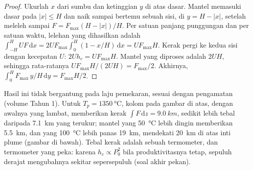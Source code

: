 \begin{proof}
Ukurlah $x$ dari sumbu dan ketinggian $y$ di atas dasar. Mantel memasuki dasar
pada $|x| \le H$ dan naik sampai bertemu sebuah sisi, di $y = H - |x|$, setelah meleleh sampai
$F = F_{\max}(H - |x|)/H$. Per satuan panjang punggungan dan per satuan waktu, lelehan yang dihasilkan adalah
$\int_{-H}^{H} U F\,\mathrm dx = 2UF_{\max}\int_0^H (1 - x/H)\,\mathrm dx =
UF_{\max}H$. Kerak pergi ke kedua sisi dengan kecepatan $U$: $2Uh_c = UF_{\max}H$.
Mantel yang diproses adalah $2UH$, sehingga  rata-ratanya $UF_{\max}H/(2UH) =
F_{\max}/2$. Akhirnya, $\int_0^H F_{\max}\,y/H\,\mathrm dy = F_{\max}H/2$.
\end{proof}

Hasil ini tidak bergantung pada laju pemekaran, sesuai dengan pengamatan (volume
Tahun 1). Untuk $T_p = \qty{1350}{\celsius}$, kolom pada gambar di atas, dengan
awalnya yang lambat, memberikan kerak $\int F\,\mathrm dz = \qty{9.0}{km}$, sedikit lebih
tebal daripada \qty{7.1}{km} yang terukur; mantel yang \qty{50}{\celsius} lebih dingin memberikan
\qty{5.5}{km}, dan yang \qty{100}{\celsius} lebih panas \qty{19}{km}, mendekati
\qty{20}{km} di atas inti plume (gambar di bawah). Tebal kerak adalah sebuah
termometer, dan termometer yang peka: karena $h_c \propto P_0^2$ bila produktivitasnya
tetap, sepuluh derajat mengubahnya sekitar sepersepuluh (soal akhir pekan).

